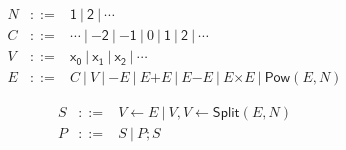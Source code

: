 
\begin{eqnarray*}
  N & ::= & \mathsf{1}\ |\ \mathsf{2}\ |\ \cdots\\
  C & ::= & \cdots \ |\ \mathsf{-2}\ |\ \mathsf{-1} \ |\ 0\ |\ 
            \mathsf{1}\ |\ \mathsf{2}\ |\ \cdots\\
  V & ::= & \mathsf{x_0}\ |\ \mathsf{x_1}\ |\ \mathsf{x_2}\ |\ \cdots\\
  E & ::= &  C \ |\ V \ |\  \mathsf{-}E \ |\ E \mathsf{+} E 
             \ |\ E \mathsf{-} E
             \ |\ E \mathsf{\times} E \ |\ \mathsf{Pow} (E, N)
\end{eqnarray*}

\begin{eqnarray*}
  S & ::= & V \mathsf{\leftarrow} E 
            \ |\  V, V \mathsf{\leftarrow} \mathsf{Split} (E, N)\\
  P & ::= & S \ |\ P; S
\end{eqnarray*}